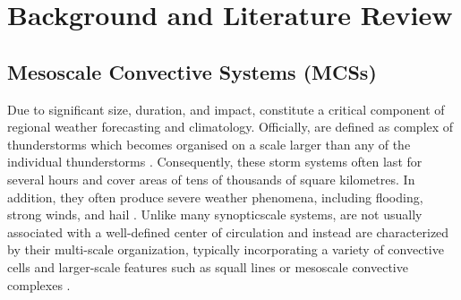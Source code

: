 \chapter{Background and Literature Review}
\label{ch:background}





\section{Mesoscale Convective Systems (MCSs)}

Due to significant size, duration, and impact,  constitute a critical component of regional weather forecasting and climatology. Officially,  are defined as complex of thunderstorms which becomes organised on a scale larger than any of the individual thunderstorms \cite{NOAANWS2025}. Consequently, these storm systems often last for several hours and cover areas of tens of thousands of square kilometres. In addition, they often produce severe weather phenomena, including flooding, strong winds, and hail \citep{Houze2014}. Unlike many \Gls{synopticscale} systems,  are not usually associated with a well-defined center of circulation and instead are characterized by their multi-scale organization, typically incorporating a variety of convective cells and larger-scale features such as squall lines or mesoscale convective complexes \cite{NOAANWS2025,AMS2024}.

